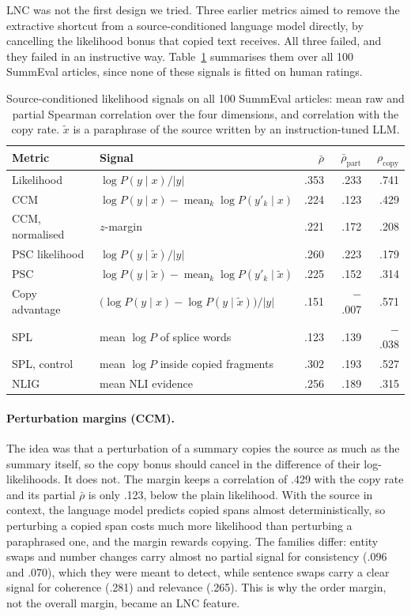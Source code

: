 LNC was not the first design we tried. Three earlier metrics aimed to remove the extractive shortcut from a source-conditioned language model directly, by cancelling the likelihood bonus that copied text receives. All three failed, and they failed in an instructive way. Table~\ref{tab:negative} summarises them over all 100 SummEval articles, since none of these signals is fitted on human ratings.

\begin{table}[t]
\centering
\caption{Source-conditioned likelihood signals on all 100 SummEval articles: mean raw and partial Spearman correlation over the four dimensions, and correlation with the copy rate. $\tilde x$ is a paraphrase of the source written by an instruction-tuned LLM.}
\label{tab:negative}
\small
\begin{tabular}{@{}llrrr@{}}
\toprule
Metric & Signal & $\bar\rho$ & $\bar\rho_{\mathrm{part}}$ & $\rho_{\mathrm{copy}}$ \\
\midrule
Likelihood & $\log P(y\mid x)/|y|$ & .353 & .233 & .741 \\
CCM & $\log P(y\mid x) - \operatorname{mean}_k \log P(y'_k\mid x)$ & .224 & .123 & .429 \\
CCM, normalised & $z$-margin & .221 & .172 & .208 \\
\midrule
PSC likelihood & $\log P(y\mid \tilde x)/|y|$ & .260 & .223 & .179 \\
PSC & $\log P(y\mid \tilde x) - \operatorname{mean}_k \log P(y'_k\mid \tilde x)$ & .225 & .152 & .314 \\
Copy advantage & $\bigl(\log P(y\mid x) - \log P(y\mid \tilde x)\bigr)/|y|$ & .151 & $-$.007 & .571 \\
\midrule
SPL & mean $\log P$ of splice words & .123 & .139 & $-$.038 \\
SPL, control & mean $\log P$ inside copied fragments & .302 & .193 & .527 \\
\midrule
NLIG & mean NLI evidence & .256 & .189 & .315 \\
\bottomrule
\end{tabular}
\end{table}

\paragraph{Perturbation margins (CCM).} The idea was that a perturbation of a summary copies the source as much as the summary itself, so the copy bonus should cancel in the difference of their log-likelihoods. It does not. The margin keeps a correlation of .429 with the copy rate and its partial $\bar\rho$ is only .123, below the plain likelihood. With the source in context, the language model predicts copied spans almost deterministically, so perturbing a copied span costs much more likelihood than perturbing a paraphrased one, and the margin rewards copying. The families differ: entity swaps and number changes carry almost no partial signal for consistency (.096 and .070), which they were meant to detect, while sentence swaps carry a clear signal for coherence (.281) and relevance (.265). This is why the order margin, not the overall margin, became an LNC feature.

